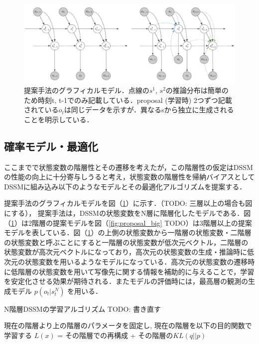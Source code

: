 \begin{figure}[tbp]
  \begin{center}
    \includegraphics[width=\linewidth]{./figures/proposal.png}
    \caption[提案手法のグラフィカルモデル]{提案手法のグラフィカルモデル．点線の$s^1$, $s^2$の推論分布は簡単のため時刻t, t-1でのみ記載している．proposal (学習時) 2つずつ記載されている$o_t$は同じデータを示すが．異なるsから独立に生成されることを明示している．}
    \label{fig:proposal}
  \end{center}
\end{figure}

\subsection{確率モデル・最適化}

ここまでで状態変数の階層性とその遷移を考えたが，この階層性の仮定はDSSMの性能の向上に十分寄与しうると考え，状態変数の階層性を帰納バイアスとしてDSSMに組み込み以下のようなモデルとその最適化アルゴリズムを提案する．

\vspace{\baselineskip}
提案手法のグラフィカルモデルを図（\ref{fig:proposal}）に示す．（TODO: 三層以上の場合も図にする），
提案手法は，DSSMの状態変数をN層に階層化したモデルである．図（\ref{fig:proposal}）は2階層の提案モデルを図（\ref{fig:proposal_big} TODO）は3階層以上の提案モデルを表している．図（\ref{fig:proposal}）の上側の状態変数から一階層の状態変数・二階層の状態変数と呼ぶことにすると一階層の状態変数が低次元ベクトル，二階層の状態変数が高次元ベクトルになっており，高次元の状態変数の生成・推論時に低次元の状態変数を用いるようなモデルになっている．高次元の状態変数の遷移時に低階層の状態変数を用いて写像先に関する情報を補助的に与えることで，学習を安定化させる効果が期待される．またモデルの評価時には，最高層の観測の生成モデル $p(o_t|s^N_t)$ を用いる．

\begin{algorithm}[tbp]               
  \caption{N階層DSSMの学習アルゴリズム TODO: 書き直す}
  \label{alg1}                          
  \begin{algorithmic}
        \STATE 現在の階層より上の階層のパラメータを固定し, 
        \STATE 現在の階層を以下の目的関数で学習する
        \STATE $L(x)$ = その階層での再構成 + その階層の$KL(q||p)$ \\
      \ENDWHILE
    \ENDFOR
  \end{algorithmic}
\end{algorithm}

